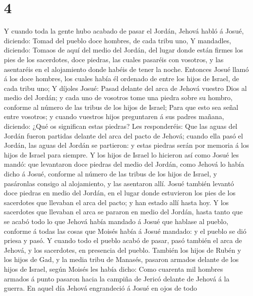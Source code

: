 \hypertarget{section-3}{%
\section{4}\label{section-3}}

 Y cuando toda la gente hubo acabado de pasar el Jordán,
Jehová habló á Josué, diciendo:  Tomad del pueblo doce
hombres, de cada tribu uno,  Y mandadles, diciendo: Tomaos
de aquí del medio del Jordán, del lugar donde están firmes los pies de
los sacerdotes, doce piedras, las cuales pasaréis con vosotros, y las
asentaréis en el alojamiento donde habéis de tener la noche.
 Entonces Josué llamó á los doce hombres, los cuales había
él ordenado de entre los hijos de Israel, de cada tribu uno;
 Y díjoles Josué: Pasad delante del arca de Jehová vuestro
Dios al medio del Jordán; y cada uno de vosotros tome una piedra sobre
su hombro, conforme al número de las tribus de los hijos de Israel;
 Para que esto sea señal entre vosotros; y cuando vuestros
hijos preguntaren á sus padres mañana, diciendo: ¿Qué os significan
estas piedras?  Les responderéis: Que las aguas del Jordán
fueron partidas delante del arca del pacto de Jehová; cuando ella pasó
el Jordán, las aguas del Jordán se partieron: y estas piedras serán por
memoria á los hijos de Israel para siempre.  Y los hijos de
Israel lo hicieron así como Josué les mandó: que levantaron doce piedras
del medio del Jordán, como Jehová lo había dicho á Josué, conforme al
número de las tribus de los hijos de Israel, y pasáronlas consigo al
alojamiento, y las asentaron allí.  Josué también levantó
doce piedras en medio del Jordán, en el lugar donde estuvieron los pies
de los sacerdotes que llevaban el arca del pacto; y han estado allí
hasta hoy.  Y los sacerdotes que llevaban el arca se
pararon en medio del Jordán, hasta tanto que se acabó todo lo que Jehová
había mandado á Josué que hablase al pueblo, conforme á todas las cosas
que Moisés había á Josué mandado: y el pueblo se dió priesa y pasó.
 Y cuando todo el pueblo acabó de pasar, pasó también el
arca de Jehová, y los sacerdotes, en presencia del pueblo. 
También los hijos de Rubén y los hijos de Gad, y la media tribu de
Manasés, pasaron armados delante de los hijos de Israel, según Moisés
les había dicho:  Como cuarenta mil hombres armados á punto
pasaron hacia la campiña de Jericó delante de Jehová á la guerra.
 En aquel día Jehová engrandeció á Josué en ojos de todo
